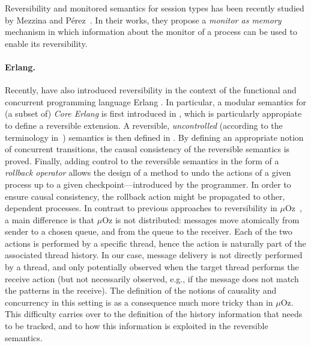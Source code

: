 \documentclass[a4paper,oneside]{article}
\begin{document}
 Reversibility and monitored semantics for session types has been recently studied by Mezzina and  P\'erez~\cite{MezzinaP16a,MezzinaP16b}. In their works, they propose a \textit{monitor as memory} mechanism in which information about the monitor of a process can be used to enable its reversibility.
 
 \paragraph{Erlang.}
Recently, \cite{NPV16,LNPV17} have also introduced reversibility in the
context of the functional and concurrent programming language Erlang
\cite{AVW96}. In particular, a modular semantics for (a subset of)
\emph{Core Erlang} \cite{CGJLNPV04} is first introduced in
\cite{NPV16}, which is particularly appropiate to define a reversible
extension. A reversible, \emph{uncontrolled} (according to the
terminology in~\cite{LMT14}) semantics is then defined in
\cite{LNPV17}. By defining an appropriate notion of concurrent
transitions, the causal consistency of the reversible semantics is
proved. Finally, adding control to the reversible semantics in the
form of a \emph{rollback operator} allows the design of a method to
undo the actions of a given process up to a given
checkpoint---introduced by the programmer. In order to ensure
causal consistency, the rollback action might be propagated to other,
dependent processes.
%
In contrast to previous approaches to reversibility in
$\mu$Oz~\cite{LLMS12,GLM14}, a main difference is that $\mu$Oz is not
distributed: messages move atomically from sender to a chosen queue,
and from the queue to the receiver. Each of the two actions is
performed by a specific thread, hence the action is naturally part of
the associated thread history. In our case, message delivery is not
directly performed by a thread, and only potentially observed when the
target thread performs the receive action (but not necessarily
observed, e.g., if the message does not match the patterns in the
receive). The definition of the notions of causality and concurrency
in this setting is as a consequence much more tricky than in
$\mu$Oz. This difficulty carries over to the definition of the history
information that needs to be tracked, and to how this information is
exploited in the reversible semantics.
\end{document}
